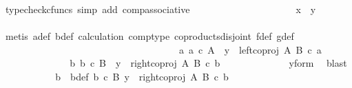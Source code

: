 \begin{isabellebody}
\ {\isacharparenleft}{\kern0pt}typecheck{\isacharunderscore}{\kern0pt}cfuncs{\isacharcomma}{\kern0pt}\ simp\ add{\isacharcolon}{\kern0pt}\ comp{\isacharunderscore}{\kern0pt}associative{}{\isacharparenright}{\kern0pt}\isanewline
\ \ \ \ \ \ \ \ \ \ \ \ \ \ \ \ \ \ \isamarkupfalse%
\ \isamarkupfalse%
\ {\isachardoublequoteopen}x\ {\isacharequal}{\kern0pt}\ y{\isachardoublequoteclose}\isanewline
\ \ \ \ \ \ \ \ \ \ \ \ \ \ \ \ \ \ \ \ \isamarkupfalse%
\ {\isacharparenleft}{\kern0pt}metis\ a{\isacharprime}{\kern0pt}{\isacharunderscore}{\kern0pt}def{\isacharparenleft}{\kern0pt}{}{\isacharparenright}{\kern0pt}\ b{\isacharunderscore}{\kern0pt}def\ calculation\ comp{\isacharunderscore}{\kern0pt}type\ coproducts{\isacharunderscore}{\kern0pt}disjoint\ f{\isacharunderscore}{\kern0pt}def{\isacharparenleft}{\kern0pt}{}{\isacharparenright}{\kern0pt}\ g{\isacharunderscore}{\kern0pt}def{\isacharparenleft}{\kern0pt}{}{\isacharparenright}{\kern0pt}{\isacharparenright}{\kern0pt}\isanewline
\ \ \ \ \ \ \ \ \ \ \ \ \ \ \ \ \isamarkupfalse%
\isanewline
\ \ \ \ \ \ \ \ \isamarkupfalse%
\isanewline
\ \ \ \ \ \ \ \ \ \ \isamarkupfalse%
\ {\isachardoublequoteopen}{\isasymnexists}a{\isachardot}{\kern0pt}\ a\ {\isasymin}\isactrlsub c\ A\ {\isasymand}\ y\ {\isacharequal}{\kern0pt}\ left{\isacharunderscore}{\kern0pt}coproj\ A\ B\ {\isasymcirc}\isactrlsub c\ a{\isachardoublequoteclose}\isanewline
\ \ \ \ \ \ \ \ \ \ \isamarkupfalse%
\ \isamarkupfalse%
\ {\isachardoublequoteopen}{\isasymexists}\ b{\isachardot}{\kern0pt}\ b\ {\isasymin}\isactrlsub c\ B\ {\isasymand}\ y\ {\isacharequal}{\kern0pt}\ right{\isacharunderscore}{\kern0pt}coproj\ A\ B\ {\isasymcirc}\isactrlsub c\ b{\isachardoublequoteclose}\isanewline
\ \ \ \ \ \ \ \ \ \ \ \ \isamarkupfalse%
\ y{\isacharunderscore}{\kern0pt}form\ \isamarkupfalse%
\ blast\isanewline
\ \ \ \ \ \ \ \ \isamarkupfalse%
\ \isamarkupfalse%
\ b{\isacharprime}{\kern0pt}\ \ b{\isacharprime}{\kern0pt}{\isacharunderscore}{\kern0pt}def{\isacharcolon}{\kern0pt}\ {\isachardoublequoteopen}b{\isacharprime}{\kern0pt}\ {\isasymin}\isactrlsub c\ B{\isachardoublequoteclose}\ {\isachardoublequoteopen}y\ {\isacharequal}{\kern0pt}\ right{\isacharunderscore}{\kern0pt}coproj\ A\ B\ {\isasymcirc}\isactrlsub c\ b{\isacharprime}{\kern0pt}{\isachardoublequoteclose}\isanewline
\ \ \ \ \ \ \ \ \ \ \isamarkupfalse%

\end{isabellebody}
